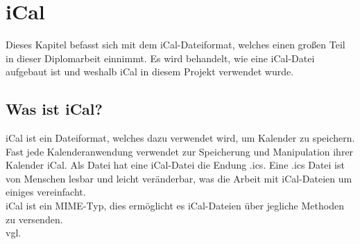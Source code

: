 
\renewcommand{\theauthor}{Matthias Franz}
\chapter{iCal}
\label{sec:iCal}
Dieses Kapitel befasst sich mit dem iCal-Dateiformat, welches einen großen Teil in dieser Diplomarbeit einnimmt. Es wird behandelt, wie eine iCal-Datei aufgebaut ist und weshalb iCal in diesem Projekt verwendet wurde.

\section{Was ist iCal?}
\label{sec:wasIstiCal?}
iCal ist ein Dateiformat, welches dazu verwendet wird, um Kalender zu speichern. Fast jede Kalenderanwendung verwendet zur Speicherung und Manipulation ihrer Kalender iCal. Als Datei hat eine iCal-Datei die Endung .ics. Eine .ics Datei ist von Menschen lesbar und leicht veränderbar, was die Arbeit mit iCal-Dateien um einiges vereinfacht. \\
iCal ist ein MIME-Typ, dies ermöglicht es iCal-Dateien über jegliche Methoden zu versenden.\\vgl. \textcite{iCalDocumentation} 

